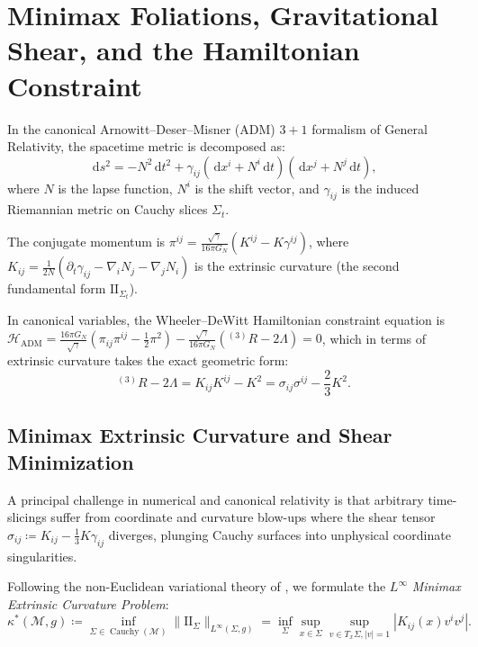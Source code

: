 \documentclass[11pt,a4paper,reqno]{amsart}
\theoremstyle{definition}
\numberwithin{equation}{section}
\providecommand{\II}{\mathrm{I\!I}}
\newcommand{\dif}{\,\mathrm{d}}
\providecommand{\II}{\mathrm{II}}
\begin{document}
\section{Minimax Foliations, Gravitational Shear, and the Hamiltonian Constraint}
\label{sec:minimax_adm}

In the canonical Arnowitt--Deser--Misner (ADM) $3+1$ formalism of General Relativity, the spacetime metric is decomposed as:
\begin{equation}
    \label{eq:adm_metric}
    \dif s^2 = -N^2 \dif t^2 + \gamma_{ij}(\dif x^i + N^i \dif t)(\dif x^j + N^j \dif t),
\end{equation}
where $N$ is the lapse function, $N^i$ is the shift vector, and $\gamma_{ij}$ is the induced Riemannian metric on Cauchy slices $\Sigma_t$.

The conjugate momentum is $\pi^{ij} = \frac{\sqrt{\gamma}}{16\pi G_N}(K^{ij} - K \gamma^{ij})$, where $K_{ij} = \frac{1}{2N}(\partial_t \gamma_{ij} - \nabla_i N_j - \nabla_j N_i)$ is the extrinsic curvature (the second fundamental form $\II_{\Sigma_t}$).

In canonical variables, the Wheeler--DeWitt Hamiltonian constraint equation is $\mathcal{H}_{\mathrm{ADM}} = \frac{16\pi G_N}{\sqrt{\gamma}}\left( \pi_{ij}\pi^{ij} - \frac{1}{2}\pi^2 \right) - \frac{\sqrt{\gamma}}{16\pi G_N}\left( {}^{(3)}R - 2\Lambda \right) = 0$, which in terms of extrinsic curvature takes the exact geometric form:
\begin{equation}
    \label{eq:wdw_hamiltonian}
    {}^{(3)}R - 2\Lambda = K_{ij} K^{ij} - K^2 = \sigma_{ij}\sigma^{ij} - \frac{2}{3}K^2.
\end{equation}

\subsection{Minimax Extrinsic Curvature and Shear Minimization}
A principal challenge in numerical and canonical relativity is that arbitrary time-slicings suffer from coordinate and curvature blow-ups where the shear tensor $\sigma_{ij} \coloneqq K_{ij} - \frac{1}{3} K \gamma_{ij}$ diverges, plunging Cauchy surfaces into unphysical coordinate singularities.

Following the non-Euclidean variational theory of \cite{silvafilho2026noneuclidean}, we formulate the $L^\infty$ \emph{Minimax Extrinsic Curvature Problem}:
\begin{equation}
    \label{eq:minimax_hypersurface_problem}
    \kappa^*(\mathcal{M}, g) \coloneqq \inf_{\Sigma \in \operatorname{Cauchy}(\mathcal{M})} \|\II_\Sigma\|_{L^\infty(\Sigma, g)} = \inf_\Sigma \sup_{x \in \Sigma} \sup_{v \in T_x \Sigma, |v|=1} |K_{ij}(x) v^i v^j|.
\end{equation}
\end{document}

